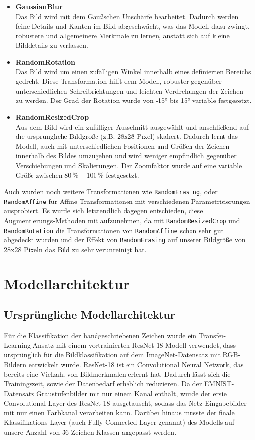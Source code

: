 \documentclass[12pt,oneside]{article}
\begin{document}
			\begin{itemize}
				\item \textbf{GaussianBlur} \\
					Das Bild wird mit dem Gaußschen Unschärfe bearbeitet. Dadurch werden feine Details und Kanten im Bild abgeschwächt, was das Modell dazu zwingt, robustere und allgemeinere Merkmale zu lernen, anstatt sich auf kleine Bilddetails zu verlassen.
				\item \textbf{RandomRotation} \\
					Das Bild wird um einen zufälligen Winkel innerhalb eines definierten Bereichs gedreht. Diese Transformation hilft dem Modell, robuster gegenüber unterschiedlichen Schreibrichtungen und leichten Verdrehungen der Zeichen zu werden. Der Grad der Rotation wurde von -15° bis 15° variable festgesetzt.
				\item \textbf{RandomResizedCrop} \\
					Aus dem Bild wird ein zufälliger Ausschnitt ausgewählt und anschließend auf die ursprüngliche Bildgröße (z.B. 28x28 Pixel) skaliert. Dadurch lernt das Modell, auch mit unterschiedlichen Positionen und Größen der Zeichen innerhalb des Bildes umzugehen und wird weniger empfindlich gegenüber Verschiebungen und Skalierungen. Der Zoomfaktor wurde auf eine variable Größe zwischen 80\,\% -- 100\,\% festgesetzt.
			\end{itemize}

		
			
			Auch wurden noch weitere Transformationen wie \texttt{RandomErasing}, oder \texttt{RandomAffine} für Affine Transformationen mit verschiedenen Parametrisierungen ausprobiert. Es wurde sich letztendlich dagegen entschieden, diese Augmentierungs-Methoden mit aufzunehmen, da mit \texttt{RandomResizedCrop} und \texttt{RandomRotation} die Transformationen von \texttt{RandomAffine} schon sehr gut abgedeckt wurden und der Effekt von \texttt{RandomErasing} auf unserer Bildgröße von 28x28 Pixeln das Bild zu sehr verunreinigt hat.

\section{Modellarchitektur}
	\subsection{Ursprüngliche Modellarchitektur}
		Für die Klassifikation der handgeschriebenen Zeichen wurde ein Transfer-Learning Ansatz mit einem vortrainierten ResNet-18 Modell \cite{he_deep_2015} verwendet, dass ursprünglich für die Bildklassifikation auf dem ImageNet-Datensatz \cite{noauthor_imagenet_nodate} mit RGB-Bildern entwickelt wurde. ResNet-18 ist ein Convolutional Neural Network, das bereits eine Vielzahl von Bildmerkmalen erlernt hat. Dadurch lässt sich die Trainingszeit, sowie der Datenbedarf erheblich reduzieren.
		Da der EMNIST-Datensatz Graustufenbilder mit nur einem Kanal enthält, wurde der erste Convolutional Layer des ResNet-18 ausgetauscht, sodass das Netz Eingabebilder mit nur einen Farbkanal verarbeiten kann. Darüber hinaus musste der finale Klassifikations-Layer (auch Fully Connected Layer genannt) des Modells auf unsere Anzahl von 36 Zeichen-Klassen angepasst werden.
	
\end{document}
